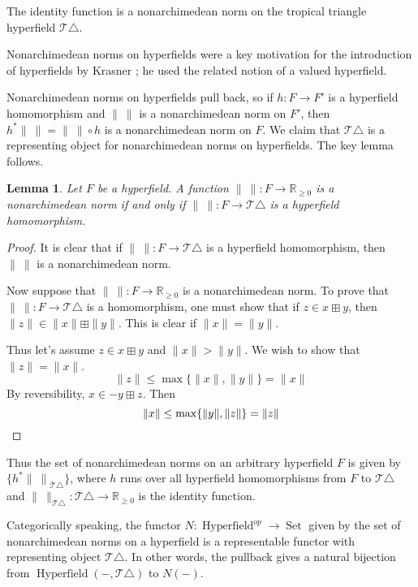 \documentclass[10pt, preprint]{article}
\newtheorem{lemma}[theorem]{Lemma}
\theoremstyle{definition}
\begin{document}
The identity function is a nonarchimedean norm on the tropical triangle
hyperfield $\mathcal{T }\triangle $.

Nonarchimedean norms on hyperfields were a key motivation for the
introduction of hyperfields by Krasner \cite{Krasner}; he used the
related notion of a valued hyperfield.

Nonarchimedean norms on hyperfields pull back, so if $h : F \to F'$ is
a hyperfield homomorphism and $\|~\|$ is a nonarchimedean norm on
$F'$, then $h^{*}\|~\| = \|~\| \circ h$ is a nonarchimedean norm on
$F$. We claim that $\mathcal{T }\triangle $ is a representing object for
nonarchimedean norms on hyperfields. The key lemma follows.\vspace*{-2pt}

\begin{lemma}
Let $F$ be a hyperfield. A function $\|~\| : F \to \mathbb{R}_{\geq 0}$
is a nonarchimedean norm if and only if $\|~\|: F \to \mathcal{T }
\triangle $ is a hyperfield homomorphism.
\end{lemma}

\begin{proof}
It is clear that if $\|~\| : F \to \mathcal{T }\triangle $ is a
hyperfield homomorphism, then $\|~\|$ is a nonarchimedean norm.

Now suppose that $\|~\| : F \to \mathbb{R}_{\geq 0}$ is a nonarchimedean
norm. To prove that $\|~\| : F \to \mathcal{T }\triangle $ is a
homomorphism, one must show that if $z \in x \boxplus y$, then
$\|z\| \in \|x\| \boxplus \|y\|$. This is clear if $\|x\| = \|y\|$.

Thus let's assume $z \in x \boxplus y$ and $\|x\| > \|y\|$. We wish to
show that $\|z\| = \|x\|$.
%
\begin{equation*}
\|z\| \leq \max \{ \|x\|,\|y\| \} = \|x\|
\end{equation*}
%
By reversibility, $x \in -y \boxplus z$. Then
%
\begin{equation*}
\|x\| \leq \max \{ \|y\|,\|z\| \} = \|z\|\qedhere
\end{equation*}
%
\end{proof}

Thus the set of nonarchimedean norms on an arbitrary hyperfield $F$ is
given by $\{ {h^{*}\|~\|}_{\mathcal{T }\triangle } \}$, where $h$ runs
over all hyperfield homomorphisms from $F$ to $\mathcal{T }\triangle
$ and $\|~\|_{\mathcal{T }\triangle } : \mathcal{T }\triangle \to
\mathbb{R}_{\geq 0}$ is the identity function.

Categorically speaking, the functor $N : \operatorname{Hyperfield}
^{op} \to \operatorname{Set}$ given by the set of nonarchimedean norms
on a hyperfield is a representable functor with representing object
$\mathcal{T }\triangle $. In other words, the pullback gives a natural
bijection from $\operatorname{Hyperfield}(-,\mathcal{T }\triangle )$ to
$N(-)$.
\end{document}

